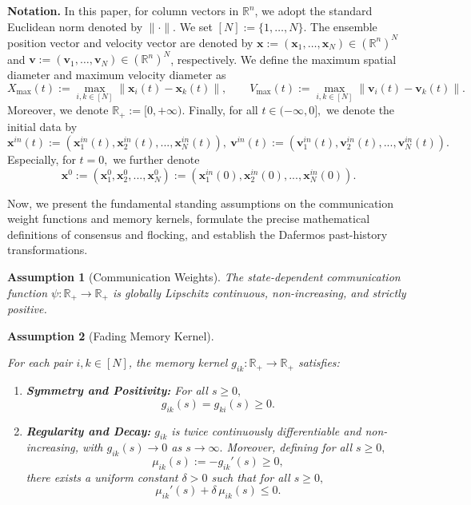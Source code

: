 \documentclass[11pt]{amsart}
\newtheorem{assumption}{Assumption}
\numberwithin{equation}{section}
\newcommand{\x}{\bm x}
\begin{document}
\noindent\textbf{Notation.} In this paper, for column vectors in $\mathbb{R}^n$, we adopt the standard Euclidean norm denoted by $\|\cdot\|$. We set $[N] := \{1, \ldots, N\}$. The ensemble position vector and velocity vector are denoted by $\boldsymbol{x} := (\boldsymbol{x}_1, \ldots, \boldsymbol{x}_N) \in (\mathbb{R}^n)^N$ and $\boldsymbol{v} := (\boldsymbol{v}_1, \ldots, \boldsymbol{v}_N) \in (\mathbb{R}^n)^N$, respectively. We define the maximum spatial diameter and maximum velocity diameter as
\begin{equation*}
	X_{\max}(t) := \max_{i,k\in[N]} \|\boldsymbol{x}_i(t) - \boldsymbol{x}_k(t)\|, \qquad V_{\max}(t) := \max_{i,k\in[N]} \|\boldsymbol{v}_i(t) - \boldsymbol{v}_k(t)\|.
\end{equation*}
Moreover, we denote $\mathbb{R}_+:=[0, +\infty).$ Finally, for all $t\in(-\infty,0],$ we denote the initial data by $\x^{in}(t):=\left(\x^{in}_1(t),\x^{in}_2(t),...,\x^{in}_N(t)\right),~\boldsymbol{v}^{in}(t):=\left(\boldsymbol{v}^{in}_1(t),\boldsymbol{v}^{in}_2(t),...,\boldsymbol{v}^{in}_N(t)\right).$ Especially, for $t=0,$ we further denote
$$
\x^{0}:=\left(\x^{0}_1,\x^{0}_2,...,\x^{0}_N\right):=\left(\x^{in}_1(0),\x^{in}_2(0),...,\x^{in}_N(0)\right).
$$


Now, we present the fundamental standing assumptions on the communication weight functions and memory kernels, formulate the precise mathematical definitions of consensus and flocking, and establish the Dafermos past-history transformations.

\begin{assumption}[Communication Weights]\label{assum:psi}
{\rm
The state-dependent communication function $\psi : \mathbb{R}_+ \to \mathbb{R}_+$ is globally Lipschitz continuous, non-increasing, and strictly positive.
}
\end{assumption}

\begin{assumption}[Fading Memory Kernel]\label{assum:g}
{\rm
For each pair $i,k \in [N]$, the memory kernel $g_{ik} : \mathbb{R}_+ \to \mathbb{R}_+$ satisfies:
\begin{enumerate}
  \item [\rm (i)] \textbf{Symmetry and Positivity:} For all $s \ge 0,$
  $$
  g_{ik}(s) = g_{ki}(s) \ge 0.
  $$
  \item [\rm (ii)] \textbf{Regularity and Decay:} $g_{ik}$ is twice continuously differentiable and non-increasing, with $g_{ik}(s) \rightarrow  0$ as $s\rightarrow \infty.$ Moreover, defining for all $s\ge0,$
  \begin{equation*}\label{eq:mu_def}
  \mu_{ik}(s) := -g_{ik}'(s) \ge 0,
  \end{equation*}
  there exists a uniform constant $\delta > 0$ such that for all $s\ge0,$
  \begin{equation}\label{eq:g_decay}
      \mu_{ik}'(s) + \delta\, \mu_{ik}(s) \le 0.
  \end{equation}
\end{enumerate}
}
\end{assumption}
\end{document}
